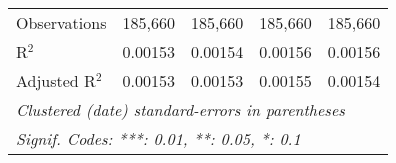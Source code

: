 \begin{table}[H]
\begin{tabular}{lcccc}
      Observations   & 185,660        & 185,660       & 185,660       & 185,660\\  
      R$^2$          & 0.00153        & 0.00154       & 0.00156       & 0.00156\\  
      Adjusted R$^2$ & 0.00153        & 0.00153       & 0.00155       & 0.00154\\  
      \midrule \midrule
      \multicolumn{5}{l}{\emph{Clustered (date) standard-errors in parentheses}}\\
      \multicolumn{5}{l}{\emph{Signif. Codes: ***: 0.01, **: 0.05, *: 0.1}}\\
   \end{tabular}
\end{table}
